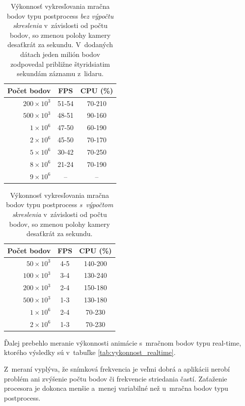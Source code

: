 \begin{table}[t]
    \centering
    \begin{tabular}{r||c|c}
        Počet bodov & FPS & CPU (\%) \\ \hline
        $200\times10^3$ & 51-54 & 70-210 \\
        $500\times10^3$ & 48-51 & 90-160 \\
        $1\times10^6$ & 47-50 & 60-190 \\
        $2\times10^6$ & 45-50 & 70-170 \\
        $5\times10^6$ & 30-42 & 70-250 \\
        $8\times10^6$ & 21-24 & 70-190 \\
        $9\times10^6$ & -- & -- \\
    \end{tabular}
    \caption{Výkonnosť vykresľovania mračna bodov typu postprocess \emph{bez výpočtu skreslenia} v~závislosti od počtu bodov, so zmenou polohy kamery desaťkrát za sekundu. V~dodaných dátach jeden milión bodov zodpovedal približne štyridsiatim sekundám záznamu z~lidaru.}
    \label{tab:vykonnost_postprocess}
\end{table}

\begin{table}[t]
    \centering
    \begin{tabular}{r||c|c}
        Počet bodov & FPS & CPU (\%) \\ \hline
        $50\times10^3$ & 4-5 & 140-200 \\
        $100\times10^3$ & 3-4 & 130-240 \\
        $200\times10^3$ & 2-4 & 150-180 \\
        $500\times10^3$ & 1-3 & 130-180 \\
        $1\times10^6$ & 2-4 & 70-230 \\
        $2\times10^6$ & 1-3 & 70-230 \\
    \end{tabular}
    \caption{Výkonnosť vykresľovania mračna bodov typu postprocess \emph{s~výpočtom skreslenia} v~závislosti od počtu bodov, so zmenou polohy kamery desaťkrát za sekundu.}
    \label{tab:vykonnost_postprocess_so_skreslenim}
\end{table}

Ďalej prebehlo meranie výkonnosti animácie s~mračnom bodov typu real-time, ktorého výsledky sú v~tabuľke \ref{tab:vykonnost_realtime}.

Z~meraní vyplýva, že snímková frekvencia je veľmi dobrá a aplikácii nerobí problém ani zvýšenie počtu bodov či frekvencie striedania častí. Zaťaženie procesora je dokonca menšie a~menej variabilné než u~mračna bodov typu postprocess.

